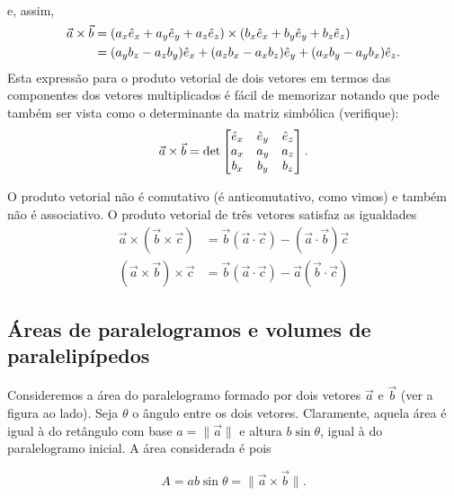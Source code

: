 e, assim,
\begin{align*}
  \vec a \times \vec b &=
  (a_x\he_x+a_y\he_y+a_z\he_z)\times
  (b_x\he_x+b_y\he_y+b_z\he_z)\\
  &=
  (a_yb_z-a_zb_y)\he_x+(a_zb_x-a_xb_z)\he_y+(a_xb_y-a_yb_x)\he_z.
\end{align*}
Esta expressão para o produto vetorial de dois vetores em termos das componentes
dos vetores multiplicados é fácil de memorizar notando que pode também ser vista
como o determinante da matriz simbólica (verifique):
\begin{equation}
  \vec a\times\vec b =\det
  \begin{bmatrix}
    \he_x&\he_y&\he_z\\
    a_x&a_y&a_z\\
    b_x&b_y&b_z
  \end{bmatrix}.
\end{equation}

O produto vetorial não é comutativo (é anticomutativo, como vimos) e também não
é associativo. O produto vetorial de três vetores satisfaz as igualdades
\begin{equation}\label{eq:tcp}
\begin{split}
\vec a\times(\vec b\times\vec c)&=\vec b(\vec a\cdot\vec c)-(\vec a\cdot\vec
b)\vec c\\
(\vec a\times\vec b)\times\vec c&=\vec b(\vec a\cdot\vec c)-\vec a(\vec
b\cdot\vec c)
\end{split}
\end{equation}

\subsection*{Áreas de paralelogramos e volumes de paralelipípedos}
\hfill
\begin{minipage}[t]{0.8\textwidth}
Consideremos a área do paralelogramo formado por dois vetores $\vec a$ e $\vec
b$ (ver a figura ao lado). Seja $\theta$ o ângulo entre os dois vetores.
Claramente, aquela área é igual à do retângulo com base $a=\|\vec a\|$ e altura
$b\sin\theta$, igual à do paralelogramo inicial. A área considerada é pois
\end{minipage}
\begin{equation}
A=ab\sin\theta=\|\vec a\times\vec b\|.
\end{equation}

